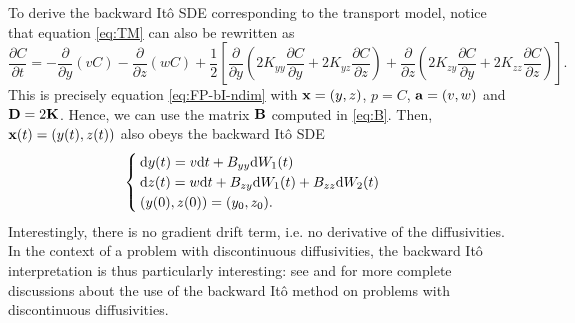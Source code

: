 To derive the backward Itô SDE corresponding to the transport model, notice that equation \eqref{eq:TM} can also be rewritten as
\begin{equation}\label{eq:TM-bito}
	\frac{\partial C}{\partial t} = -\frac{\partial}{\partial y}(vC) -\frac{\partial}{\partial z}(wC) + \frac{1}{2}\left[\frac{\partial}{\partial y} \left(2K_{yy}\frac{\partial C}{\partial y} + 2K_{yz}\frac{\partial C}{\partial z} \right) + \frac{\partial}{\partial z} \left(2K_{zy}\frac{\partial C}{\partial y} + 2K_{zz}\frac{\partial C}{\partial z}\right)\right].
\end{equation}
This is precisely equation \eqref{eq:FP-bI-ndim} with $\b x = (y,z)$, $p=C$, $\b a = (v,w)$ and $\b D = 2\b K$. Hence, we can use the matrix $\b B$ computed in \eqref{eq:B}. Then, $\b x(t) = (y(t),z(t))$ also obeys the backward Itô SDE
\begin{equation} \label{eq:bi-TM}
	\begin{cases}
		\rm dy(t) = v \rm dt + B_{yy}\rm dW_1(t)\\
		\rm dz(t) = w \rm dt + B_{zy}\rm dW_1(t) + B_{zz}\rm dW_2(t)\\
		(y(0),z(0)) = (y_0,z_0).
	\end{cases}
\end{equation}
Interestingly, there is no gradient drift term, i.e. no derivative of the diffusivities. In the context of a problem with discontinuous diffusivities, the backward Itô interpretation is thus particularly interesting: see \cite{labolle2000diffusion} and \cite{spivakovskaya2007backward} for more complete discussions about the use of the backward Itô method on problems with discontinuous diffusivities.